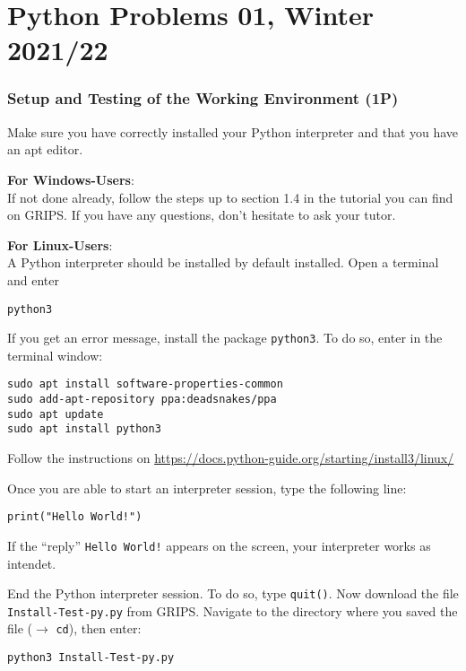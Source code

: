\documentclass[
	english,
	fontsize=10pt,
	parskip=half,
	titlepage=true,
	DIV=12
]{scrartcl}
\begin{document}
\part*{Python Problems 01, Winter 2021/22}

\section{Setup and Testing of the Working Environment (1\;P)}
Make sure you have correctly installed your Python interpreter and that you have an apt editor.

\textbf{For Windows-Users}:\\
If not done already, follow the steps up to section 1.4 in the tutorial you can find on GRIPS. If you have any questions, don't hesitate to ask your tutor.

\textbf{For Linux-Users}:\\
A Python interpreter should be installed by default installed. Open a terminal and enter
\begin{center}
	\texttt{python3}
\end{center}
If you get an error message, install the package \texttt{python3}. To do so, enter in the terminal window:
\begin{center}
	\texttt{sudo apt install software-properties-common}\\
	\texttt{sudo add-apt-repository ppa:deadsnakes/ppa}\\
	\texttt{sudo apt update}\\
	\texttt{sudo apt install python3}
\end{center}

Follow the instructions on \url{https://docs.python-guide.org/starting/install3/linux/}

Once you are able to start an interpreter session, type the following line:
\begin{center}
	\texttt{print("Hello World!")}
\end{center}
If the \enquote{reply} \texttt{Hello World!} appears on the screen, your interpreter works as intendet.

End the Python interpreter session. To do so, type \texttt{quit()}. Now download the file  \texttt{Install-Test-py.py} from GRIPS. Navigate to the directory where you saved the file ($\rightarrow$ \texttt{cd}), then enter:
\begin{center}
	\texttt{python3 Install-Test-py.py}
\end{center}
\end{document}
